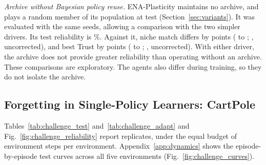 \textit{Archive without Bayesian policy reuse.} ENA-Plasticity maintains no archive, and plays a random member of its population at test (Section~\ref{sec:variants}). It was evaluated with the same seeds, allowing a comparison with the two simpler drivers. Its test reliability is \%. Against it, niche match differs by  points ( to ; , uncorrected), and best Trust by  points ( to ; , uncorrected). With either driver, the archive does not provide greater reliability than operating without an archive. These comparisons are exploratory. The agents also differ during training, so they do not isolate the archive.



\subsection{Forgetting in Single-Policy Learners: CartPole}
\label{sec:forgetting_cartpole}
Tables~\ref{tab:challenge_test} and~\ref{tab:challenge_adapt} and Fig.~\ref{fig:challenge_reliability} report  replicates, under the equal budget of  environment steps per environment. Appendix~\ref{app:dynamics} shows the episode-by-episode test curves across all five environments (Fig.~\ref{fig:challenge_curves}).

